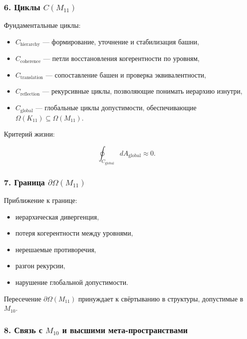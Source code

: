 \subsubsection*{6. Циклы $C(M_{11})$}

Фундаментальные циклы:

\begin{itemize}
    \item $C_{\mathrm{hierarchy}}$ — формирование, уточнение и стабилизация башни,
    \item $C_{\mathrm{coherence}}$ — петли восстановления когерентности по уровням,
    \item $C_{\mathrm{translation}}$ — сопоставление башен и проверка эквивалентности,
    \item $C_{\mathrm{reflection}}$ — рекурсивные циклы, позволяющие
          понимать иерархию изнутри,
    \item $C_{\mathrm{global}}$ — глобальные циклы допустимости, обеспечивающие
          $\Omega(K_{11})\subseteq\Omega(M_{11})$.
\end{itemize}

Критерий жизни:

\[
\oint_{C_{\mathrm{global}}} dA_{\mathrm{global}} \approx 0.
\]

\subsubsection*{7. Граница \texorpdfstring{$\partial\Omega(M_{11})$}{\partial\Omega(M_{11})}}

Приближение к границе:

\begin{itemize}
    \item иерархическая дивергенция,
    \item потеря когерентности между уровнями,
    \item нерешаемые противоречия,
    \item разгон рекурсии,
    \item нарушение глобальной допустимости.
\end{itemize}

Пересечение $\partial\Omega(M_{11})$ принуждает к свёртыванию в структуры, допустимые в $M_{10}$.

\subsubsection*{8. Связь с $M_{10}$ и высшими мета-пространствами}

